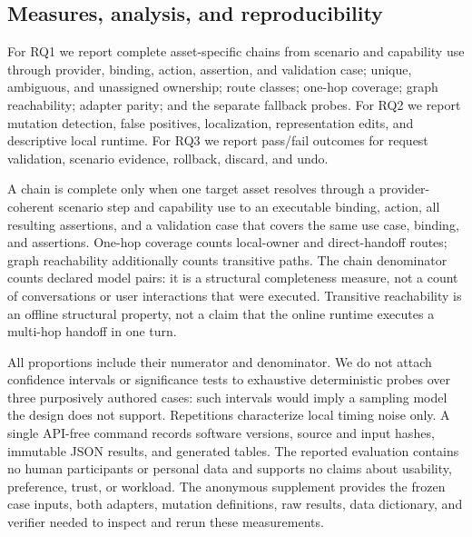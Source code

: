 \subsection{Measures, analysis, and reproducibility}

For RQ1 we report complete asset-specific chains from scenario and capability
use through provider, binding, action, assertion, and validation case; unique,
ambiguous, and unassigned ownership; route classes; one-hop coverage; graph
reachability; adapter parity; and the separate fallback probes. For RQ2 we
report mutation detection, false positives, localization, representation edits,
and descriptive local runtime. For RQ3 we report pass/fail outcomes for request
validation, scenario evidence, rollback, discard, and undo.

A chain is complete only when one target asset resolves through a
provider-coherent scenario step and capability use to an executable binding,
action, all resulting assertions, and a validation case that covers the same
use case, binding, and assertions. One-hop coverage counts local-owner and
direct-handoff routes; graph reachability additionally counts transitive paths.
The chain denominator counts declared model pairs: it is a structural
completeness measure, not a count of conversations or user interactions that
were executed.
Transitive reachability is an offline structural property, not a claim that the
online runtime executes a multi-hop handoff in one turn.

All proportions include their numerator and denominator. We do not attach
confidence intervals or significance tests to exhaustive deterministic probes
over three purposively authored cases: such intervals would imply a sampling
model the design does not support. Repetitions characterize local timing noise
only. A single API-free command records software versions, source and input
hashes, immutable JSON results, and generated tables. The reported evaluation
contains no human participants or personal data and supports no claims about
usability, preference, trust, or workload. The anonymous supplement provides
the frozen case inputs, both adapters, mutation definitions, raw results, data
dictionary, and verifier needed to inspect and rerun these measurements.
